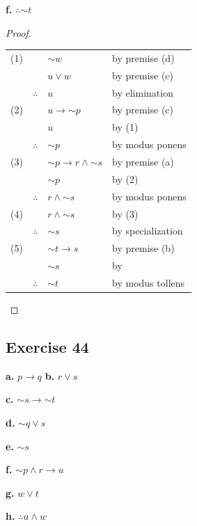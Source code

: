 \documentclass[14pt]{extarticle}
\begin{document}
{\bf f.} $\therefore {\sim t}$

\begin{proof} \begin{tabular}{rrll} (1) & & ${\sim w}$ & by premise (d) \\ & &
$u \vee w$ & by premise (c) \\ & $\therefore$ & $u$ & by elimination \\ (2) & &
$u \to {\sim p}$ & by premise (c)\\ & & $u$ & by (1) \\ & $\therefore$ & ${\sim
p}$ & by modus ponens \\ (3) & & ${\sim p} \to r \wedge {\sim s}$ & by premise
(a) \\ & & ${\sim p}$ & by (2) \\ & $\therefore$ & $r \wedge {\sim s}$ & by
modus ponens \\ (4) & & $r \wedge {\sim s}$ & by (3) \\ & $\therefore$ & ${\sim
s}$ & by specialization \\ (5) & & ${\sim t} \to s$ & by premise (b) \\ & &
${\sim s}$ & by \\ & $\therefore$ & ${\sim t}$ & by modus tollens \\
\end{tabular} \end{proof}

\subsection{Exercise 44} {\bf a.} $p \to q$
{\bf b.} $r \vee s$

{\bf c.} ${\sim s} \to {\sim t}$

{\bf d.} ${\sim q} \vee s$

{\bf e.} ${\sim s}$

{\bf f.} ${\sim p} \wedge r \to u$

{\bf g.} $w \vee t$

{\bf h.} $\therefore u \wedge w$
\end{document}

